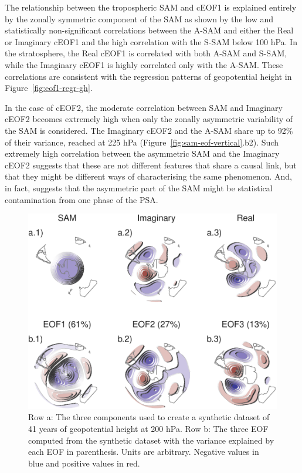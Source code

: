 \documentclass[smallextended]{svjour3}       %
\begin{document}
The relationship between the tropospheric SAM and cEOF1 is explained entirely by the zonally symmetric component of the SAM as shown by the low and statistically non-significant correlations between the A-SAM and either the Real or Imaginary cEOF1 and the high correlation with the S-SAM below 100 hPa. In the stratosphere, the Real cEOF1 is correlated with both A-SAM and S-SAM, while the Imaginary cEOF1 is highly correlated only with the A-SAM. These correlations are consistent with the regression patterns of geopotential height in Figure~\ref{fig:eof1-regr-gh}.

In the case of cEOF2, the moderate correlation between SAM and Imaginary cEOF2 becomes extremely high when only the zonally asymmetric variability of the SAM is considered. The Imaginary cEOF2 and the A-SAM share up to 92\% of their variance, reached at 225 hPa (Figure~\ref{fig:sam-eof-vertical}.b2). Such extremely high correlation between the asymmetric SAM and the Imaginary cEOF2 suggests that these are not different features that share a causal link, but that they might be different ways of characterising the same phenomenon. And, in fact, suggests that the asymmetric part of the SAM might be statistical contamination from one phase of the PSA.



\begin{figure}
\centering
\includegraphics{../figures/fake-eof-1.pdf}
\caption{\label{fig:fake-eof}Row a: The three components used to create a synthetic dataset of 41 years of geopotential height at 200 hPa. Row b: The three EOF computed from the synthetic dataset with the variance explained by each EOF in parenthesis. Units are arbitrary. Negative values in blue and positive values in red.}
\end{figure}
\end{document}
